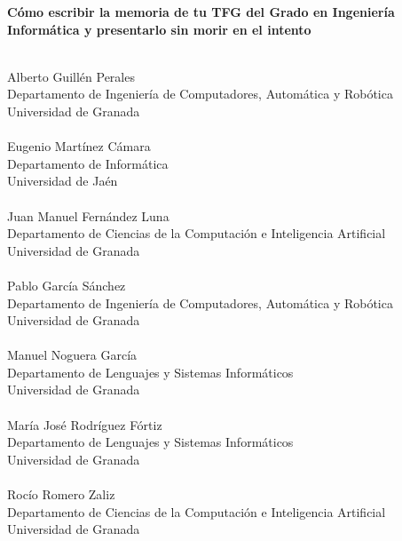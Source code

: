 \documentclass{book}
\begin{document}
\begin{titlepage}
    \begin{minipage}{0.9\textwidth}
 \textbf{Cómo escribir la memoria de tu TFG del Grado en Ingeniería Informática y presentarlo sin morir en el intento} \\ \\
        \small
      
       Alberto Guillén Perales\\
       Departamento de Ingeniería de Computadores, Automática y Robótica\\
       Universidad de Granada\\ 
       \vspace{1ex}\\
       Eugenio Martínez Cámara \\ 
       Departamento de Informática \\
       Universidad de Jaén\\
       \vspace{1ex}\\
       Juan Manuel Fernández Luna\\
       Departamento de Ciencias de la Computación e Inteligencia Artificial\\
       Universidad de Granada\\ 
       \vspace{1ex}\\
       Pablo García Sánchez\\
       Departamento de Ingeniería de Computadores, Automática y Robótica\\
       Universidad de Granada\\ 
       \vspace{1ex}\\
       Manuel Noguera García\\
       Departamento de Lenguajes y Sistemas Informáticos \\
       Universidad de Granada\\ 
       \vspace{1ex}\\
       María José Rodríguez Fórtiz\\
       Departamento de Lenguajes y Sistemas Informáticos \\
       Universidad de Granada\\ 
       \vspace{1ex} \\
       Rocío Romero Zaliz\\
       Departamento de Ciencias de la Computación e Inteligencia Artificial\\
       Universidad de Granada\\ 


\end{minipage}
\end{titlepage}
\end{document}
